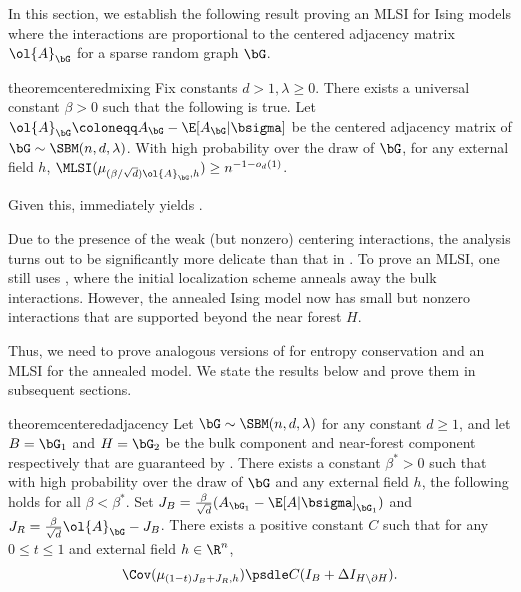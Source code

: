 \documentclass[11pt,letterpaper]{article}
\begin{document}
In this section, we establish the following result proving an MLSI for Ising models where the interactions are proportional to the centered adjacency matrix $\ol{A}_{\bG}$ for a sparse random graph $\bG$.

\begin{restatable}{theorem}{centeredmixing}
    \label{thm:main-centered-mixing}
    Fix constants $d > 1, \lambda \geq 0$. There exists a universal constant $\beta > 0$ such that the following is true. Let $\ol{A}_{\bG} \coloneqq A_{\bG} - \E[A_{\bG}|\bsigma]$ be the centered adjacency matrix of $\bG \sim \SBM(n, d, \lambda)$. With high probability over the draw of $\bG$, for any external field $h$, $\MLSI(\mu_{(\beta/\sqrt{d})\ol{A}_{\bG}, h}) \ge n^{-1-o_d(1)}$. 
\end{restatable}
Given this,  immediately yields .

Due to the presence of the weak (but nonzero) centering interactions, the analysis turns out to be significantly more delicate than that in . To prove an MLSI, one still uses , where the initial localization scheme anneals away the bulk interactions.
However, the annealed Ising model now has small but nonzero interactions that are supported beyond the near forest $H$. 

Thus, we need to prove analogous versions of  for entropy conservation and an MLSI for the annealed model.
We state the results below and prove them in subsequent sections.

\begin{restatable}{theorem}{centeredadjacency}
    \label{thm:centered-adjacency}
    Let $\bG \sim \SBM(n, d, \lambda)$ for any constant $d\ge 1$, and let $B = \bG_1$ and $H = \bG_2$ be the bulk component and near-forest component respectively that are guaranteed by .     
    There exists a constant $\beta^* > 0$ such that with high probability over the draw of $\bG$ and any external field $h$, the following holds for all $\beta < \beta^*$. Set $J_B = \frac{\beta}{\sqrt{d}}(A_{\bG_1} - \E[A| \bsigma]_{\bG_1})$ and $J_R = \frac{\beta}{\sqrt{d}}\ol{A}_{\bG} - J_B$. There exists a positive constant $C$ such that for any $0 \le t \le 1$ and external field $h \in \R^n$,
    \[ \Cov(\mu_{(1-t)J_B+ J_R,h}) \psdle C(I_{B} + \Delta I_{H \setminus \partial H}). \]
\end{restatable}
\end{document}
